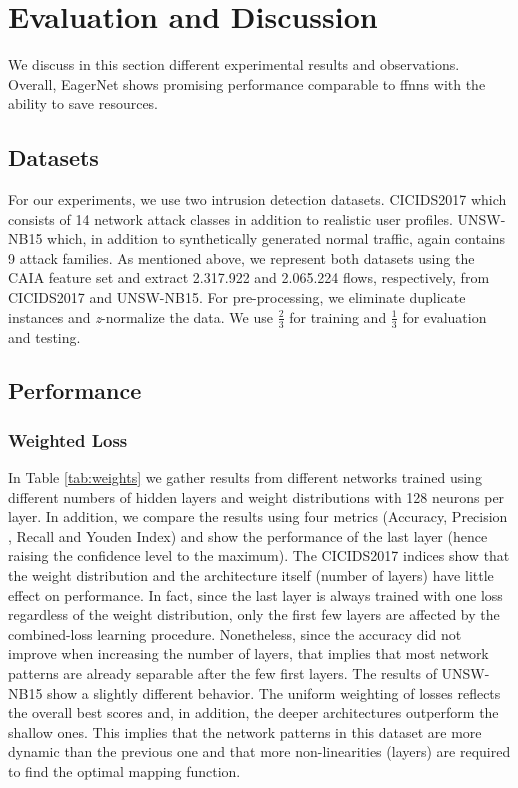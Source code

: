 \documentclass[conference]{IEEEtran}
\begin{document}
\section{Evaluation and Discussion}
\label{evaluation_and_discussion}
We discuss in this section different experimental results and observations. Overall, EagerNet shows promising performance comparable to \glspl{ffnn} with the ability to save resources.

\subsection{Datasets}
For our experiments, we use two intrusion detection datasets. CICIDS2017 \cite{sharafaldin_toward_2018} which consists of 14 network attack classes in addition to realistic user profiles. UNSW-NB15 \cite{moustafa_unsw-nb15_2015} which, in addition to synthetically generated normal traffic, again contains 9 attack families. As mentioned above, we represent both datasets using the CAIA feature set and extract 2.317.922 and 2.065.224 flows, respectively, from CICIDS2017 and UNSW-NB15. For pre-processing, we eliminate duplicate instances and \emph{z}-normalize the data. We use $\frac{2}{3}$ for training and $\frac{1}{3}$ for evaluation and testing.

\subsection{Performance}

\subsubsection{Weighted Loss}
In Table \ref{tab:weights} we gather results from different networks trained using different numbers of hidden layers and weight distributions with 128 neurons per layer. In addition, we compare the results using four metrics (Accuracy, Precision , Recall and Youden Index) and show the performance of the last layer (hence raising the confidence level to the maximum). The CICIDS2017 indices show that the weight distribution and the architecture itself (number of layers) have little effect on performance. In fact, since the last layer is always trained with one loss regardless of the weight distribution, only the first few layers are affected by the combined-loss learning procedure. Nonetheless, since the accuracy did not improve when increasing the number of layers, that implies that most network patterns are already separable after the few first layers. The results of UNSW-NB15 show a slightly different behavior. The uniform weighting of losses reflects the overall best scores and, in addition, the deeper architectures outperform the shallow ones. This implies that the network patterns in this dataset are more dynamic than the previous one and that more non-linearities (layers) are required to find the optimal mapping function.
\end{document}
